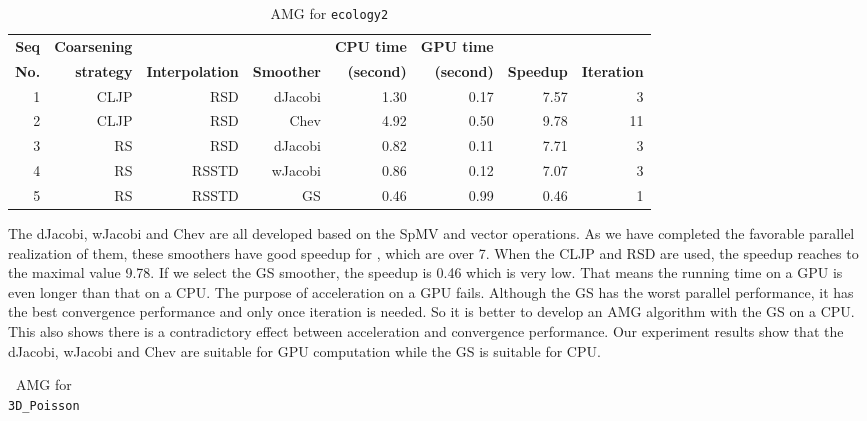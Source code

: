 \documentclass[runningheads,a4paper]{llncs}
\begin{document}
{\begin{table}\caption{AMG for \texttt{ecology2}}
\begin{tabular}{|r|r|r|r|r|r|r|r|} \hline

\bfseries Seq & \bfseries Coarsening & \bfseries               & \bfseries          & \bfseries CPU time & \bfseries GPU time & \bfseries         & \bfseries           \\
\bfseries No. & \bfseries strategy   & \bfseries Interpolation & \bfseries Smoother & \bfseries (second) & \bfseries (second) & \bfseries Speedup & \bfseries Iteration \\ \hline
1	          &CLJP	       &RSD	    &dJacobi	    &1.30	       &0.17	       &7.57	   &3\\ \hline
2	          &CLJP	       &RSD	    &Chev	        &4.92	       &0.50	       &9.78	   &11\\ \hline
3	          &RS	       &RSD	    &dJacobi	    &0.82	       &0.11	       &7.71	   &3\\ \hline
4	          &RS	       &RSSTD	 &wJacobi	    &0.86	       &0.12	       &7.07	   &3\\ \hline
5	          &RS	       &RSSTD	 &GS	        &0.46	       &0.99	       &0.46	   &1\\ \hline
\end{tabular}
\label{tbl_amg_ecology2}
\end{table}

The dJacobi, wJacobi and Chev are all developed based on the SpMV and vector operations. As we have completed the favorable parallel realization of them, these smoothers have good speedup for  , which are over 7. When the CLJP and RSD are used, the speedup reaches to the maximal value 9.78. If we select the GS smoother, the speedup is 0.46 which is very low. That means the running time on a GPU is even longer than that on a CPU. The purpose of acceleration on a GPU fails. Although the GS has the worst parallel performance, it has the best convergence performance and only once iteration is needed. So it is better to develop an AMG algorithm with the GS on a CPU. This also shows there is a contradictory effect between acceleration and convergence performance. Our experiment results show that the dJacobi, wJacobi and Chev are suitable for GPU computation while the GS is suitable for CPU.

\begin{table}\caption{AMG for \texttt{3D\_Poisson}}
\begin{tabular}{|r|r|r|r|r|r|r|r|} \hline


\end{tabular}
\end{table}}
\end{document}
